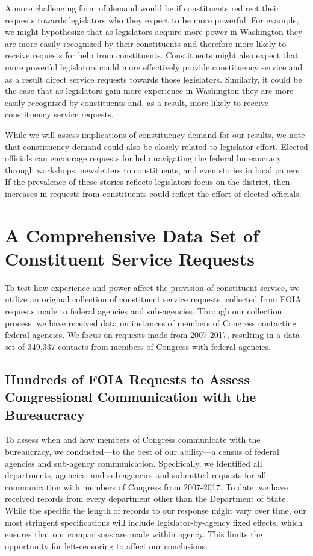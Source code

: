 \documentclass{article}
\begin{document}
A more challenging form of demand would be if constituents redirect their requests towards legislators who they expect to be more powerful.  For example, we might hypothesize that as legislators acquire more power in Washington they are more easily recognized by their constituents and therefore more likely to receive requests for help from constituents.  Constituents might also expect that more powerful legislators could more effectively provide constituency service and as a result direct service requests towards those legislators.  Similarly, it could be the case that as legislators gain more experience in Washington they are more easily recognized by constituents and, as a result, more likely to receive constituency service requests. 

While we will assess implications of constituency demand for our results, we note that constituency demand could also be closely related to legislator effort. Elected officials can encourage requests for help navigating the federal bureaucracy through workshops, newsletters to constituents, and even stories in local papers.  If the prevalence of these stories reflects legislators focus on the district, then increases in requests from constituents could reflect the effort of elected officials.  

\section{A Comprehensive Data Set of Constituent Service Requests} \label{s:data}
To test how experience and power affect the provision of constituent service, we utilize an original collection of constituent service requests, collected from  FOIA requests made to federal agencies and sub-agencies.  Through our collection process, we have received data on  instances of members of Congress contacting federal agencies.  We focus on requests made from 2007-2017, resulting in a data set of 349,337 contacts from members of Congress with federal agencies. 

\subsection{Hundreds of FOIA Requests to Assess Congressional Communication with the Bureaucracy}
To assess when and how members of Congress communicate with the bureaucracy, we conducted---to the best of our ability---a census of federal agencies and sub-agency communication.  Specifically, we identified all departments, agencies, and sub-agencies and submitted requests for all communication with members of Congress from 2007-2017.  To date, we have received records from every department other than the Department of State.  While the specific the length of records to our response might vary over time, our most stringent specifications will include legislator-by-agency fixed effects, which ensures that our comparisons are made within agency.  This limits the opportunity for left-censoring to affect our conclusions.
\end{document}
